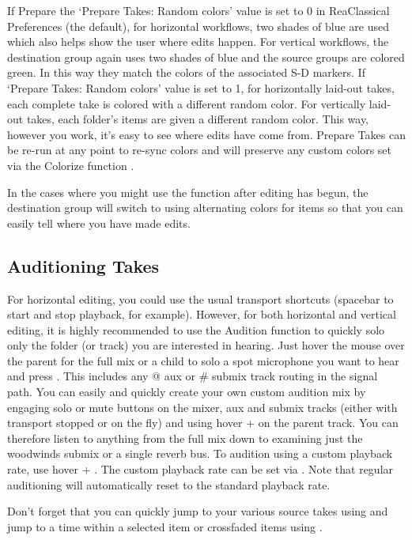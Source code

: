 \documentclass[10pt,american]{article}
\begin{document}
If Prepare the `Prepare Takes: Random colors' value is set to 0 in ReaClassical
Preferences  (the default), for horizontal workflows, two shades of
blue are used which also helps show the user where edits happen. For vertical
workflows, the destination group again uses two shades of blue and the source
groups are colored green. In this way they match the colors of the associated
S-D markers. If `Prepare Takes: Random colors' value is set to 1, for
horizontally laid-out takes, each complete take is colored with a different
random color. For vertically laid-out takes, each folder's items are given a
different random color. This way, however you work, it's easy to see where edits
have come from. Prepare Takes can be re-run at any point to re-sync colors and
will preserve any custom colors set via the Colorize function .

In the cases where you might use the function after editing has begun, the
destination group will switch to using alternating colors for items so that you
can easily tell where you have made edits.

\subsection{Auditioning Takes}

For horizontal editing, you could use the usual transport shortcuts (spacebar to
start and stop playback, for example). However, for both horizontal and vertical
editing, it is highly recommended to use the Audition function to quickly solo
only the folder (or track) you are interested in hearing. Just hover the mouse
over the parent for the full mix or a child to solo a spot microphone you want
to hear and press  . This includes any @ aux or \# submix track routing
in the signal path. You can easily and quickly create your own custom audition
mix by engaging solo or mute buttons on the mixer, aux and submix tracks (either
with transport stopped or on the fly) and using hover +  on the parent
track. You can therefore listen to anything from the full mix down to examining
just the woodwinds submix or a single reverb bus. To audition using a custom
playback rate, use hover + . The custom playback rate can be set
via . Note that regular auditioning will automatically reset to the
standard playback rate. 

Don't forget that you can quickly jump to your various source takes using
\keys{\return} and jump to a time within a selected item or crossfaded items
using \keys{\tab} .
\end{document}
